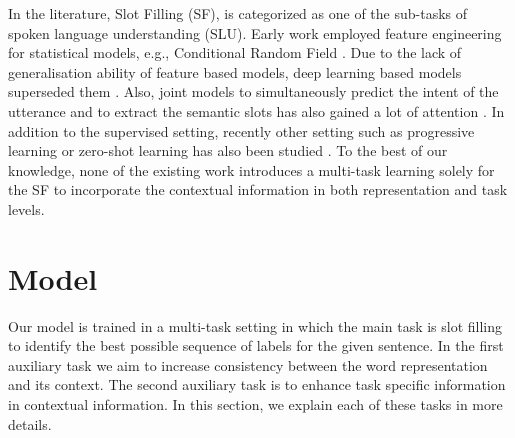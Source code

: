 \documentclass[11pt,a4paper]{article}
\begin{document}
In the literature, Slot Filling (SF), is categorized as one of the sub-tasks of spoken language understanding (SLU). Early work employed feature engineering for statistical models, e.g., Conditional Random Field \cite{raymond:07}. Due to the lack of generalisation ability of feature based models, deep learning based models superseded them \cite{yao:14,Peng:15,kurata:16,hakkani:16}. Also, joint models to simultaneously predict the intent of the utterance and to extract the semantic slots has also gained a lot of attention \cite{guo:14,liu:16,zhang:16,wang:18,goo:18,qin:19,e:19}. In addition to the supervised setting, recently other setting such as progressive learning \cite{shen:19} or zero-shot learning has also been studied \cite{shah:19}. To the best of our knowledge, none of the existing work introduces a multi-task learning solely for the SF to incorporate the contextual information in both representation and task levels.






\section{Model}

Our model is trained in a multi-task setting in which the main task is slot filling to identify the best possible sequence of labels for the given sentence. In the first auxiliary task we aim to increase consistency between the word representation and its context. The second auxiliary task is to enhance task specific information in contextual information. In this section, we explain each of these tasks in more details.
\end{document}
